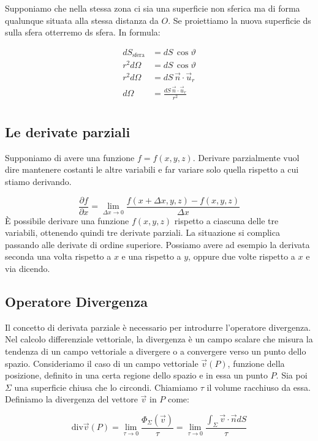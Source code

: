 Supponiamo che nella stessa zona ci sia una superficie non sferica ma di forma qualunque situata alla stessa distanza da $O$. Se proiettiamo la nuova superficie ds sulla sfera otterremo ds sfera. In formula:

\begin{align*}
	dS_{\text{sfera}} &= dS\,\cos \vartheta \\
	r^2 d\Omega &= dS\,\cos \vartheta \\
	r^2 d\Omega &= dS\,\vec{n} \cdot \vec{u}_r \\
	d\Omega &= \frac{dS\,\vec{n} \cdot \vec{u}_r}{r^2} \\
\end{align*}

\subsection{Le derivate parziali}

Supponiamo di avere una funzione $f=f(x,y,z)$.
Derivare parzialmente vuol dire mantenere costanti le altre variabili e far variare solo quella rispetto a cui stiamo derivando.

\[
	\boxed{\frac{\partial f}{\partial x} = \lim_{\Delta x \to 0} \frac{f(x+\Delta x,y,z)-f(x,y,z)}{\Delta x}}
\]
È possibile derivare una funzione $f(x,y,z)$ rispetto a ciascuna delle tre variabili, ottenendo quindi tre derivate parziali. La situazione si complica passando alle derivate di ordine superiore. Possiamo avere ad esempio la derivata seconda una volta rispetto a $x$ e una rispetto a $y$, oppure due volte rispetto a $x$ e via dicendo.

\subsection{Operatore Divergenza}

Il concetto di derivata parziale è necessario per introdurre l'operatore divergenza. Nel calcolo differenziale vettoriale, la divergenza è un campo scalare che misura la tendenza di un campo vettoriale a divergere o a convergere verso un punto dello spazio. Consideriamo il caso di un campo vettoriale $\vec{v} (P)$, funzione della posizione, definito in una certa regione dello spazio e in essa un punto $P$. Sia poi $\Sigma$ una superficie chiusa che lo circondi. Chiamiamo $\tau$ il volume racchiuso da essa. Definiamo la divergenza del vettore $\vec{v}$ in $P$ come:

\[
	\text{div}\vec{v} (P)=\lim_{\tau  \to 0} \frac{\Phi_{\Sigma}(\vec{v} )}{\tau}= \lim_{\tau  \to 0} \frac{\int_{\Sigma} \vec{v} \cdot \vec{n} dS}{\tau}
\]

